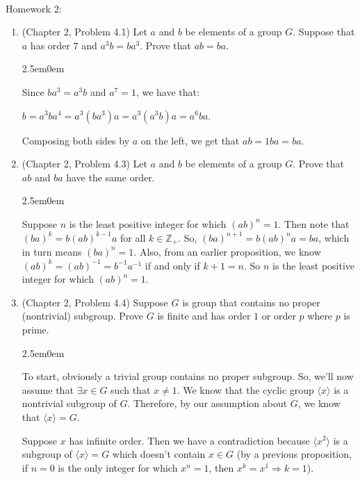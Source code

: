 \documentclass{book}
\newcommand{\exOne}{%
   \color{Purple}%
   \fontsize{13}{15}\selectfont%
}
\newenvironment{myIndent}{%
   \begin{adjustwidth}{2.5em}{0em}%
}{%
   \end{adjustwidth}%
}
\newcommand{\mySepTwo}[1][.]{%
   {\noindent\color{#1}{\rule{6.5in}{0.5mm}}}\\%
}
\newcommand{\retTwo}{\hfill\bigbreak}
\newcommand{\mHeader}[1]{{
   \color{Black}%
   \fontsize{20}{18}\selectfont%
   #1\retTwo
}}
\begin{document}
\mySepTwo

\mHeader{Homework 2:}


\begin{enumerate}
	\item (Chapter 2, Problem 4.1) Let $a$ and $b$ be elements of a group $G$. Suppose that $a$ has order $7$ and $a^3b = ba^3$. Prove that $ab = ba$.
	
	\begin{myIndent}\exOne
		Since $ba^3 = a^3b$ and $a^7 = 1$, we have that:
		
		{\centering $b = a^3ba^4 = a^3(ba^3)a = a^3(a^3b)a = a^6ba$. \retTwo\par}

		Composing both sides by $a$ on the left, we get that $ab = 1ba = ba$.\retTwo
	\end{myIndent}
	
	\item (Chapter 2, Problem 4.3) Let $a$ and $b$ be elements of a group $G$. Prove that $ab$ and $ba$ have the same order.
	
	\begin{myIndent}\exOne
		Suppose $n$ is the least positive integer for which $(ab)^n = 1$. Then note that\\ $(ba)^k = b(ab)^{k-1}a$ for all $k \in \mathbb{Z}_+$. So, $(ba)^{n+1} = b(ab)^na = ba$, which\\ in turn means $(ba)^n = 1$. Also, from an earlier proposition, we know\\ $(ab)^k = (ab)^{-1} = b^{-1}a^{-1}$ if and only if $k + 1 = n$. So $n$ is the least positive integer for which $(ab)^n = 1$.\retTwo
	\end{myIndent}

	\item (Chapter 2, Problem 4.4) Suppose $G$ is group that contains no proper (nontrivial) subgroup. Prove $G$ is finite and has order $1$ or order $p$ where $p$ is prime.
	
	\begin{myIndent}\exOne
		To start, obviously a trivial group contains no proper subgroup. So, we'll now assume that $\exists x \in G$ such that $x \neq 1$. We know that the cyclic group $\langle x \rangle$ is a nontrivial subgroup of $G$. Therefore, by our assumption about $G$, we know that $\langle x \rangle = G$.\newpage
		
		Suppose $x$ has infinite order. Then we have a contradiction because $\langle x^2 \rangle$ is a subgroup of $\langle x \rangle = G$ which doesn't contain $x \in G$ (by a previous proposition, if $n = 0$ is the only integer for which $x^n = 1$, then $x^k = x^1 \Rightarrow k = 1$).\retTwo


\end{myIndent}
\end{enumerate}
\end{document}
